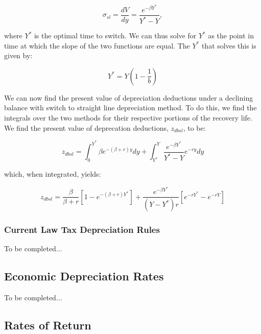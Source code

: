 \documentclass[article,11pt,letterpaper,fleqn]{article}
\theoremstyle{definition}
\numberwithin{equation}{section}
\begin{document}
\begin{equation}
\sigma_{sl} =  \frac{dV}{dy}=\frac{e^{-\beta Y^{*}}}{Y^{*}-Y},
\end{equation}

\noindent\noindent where $Y^{*}$ is the optimal time to switch. We can thus solve for $Y^{*}$ as the point in time at which the slope of the two functions are equal.  The $Y^{*}$ that solves this is given by:

\begin{equation}
Y^{*}=Y\left(1-\frac{1}{b}\right)
\end{equation}

We can now find the present value of depreciation deductions under a declining balance with switch to straight line depreciation method.  To do this, we find the integrals over the two methods for their respective portions of the recovery life.  We find the present value of deprecation deductions, $z_{dbsl}$, to be:

\begin{equation}
z_{dbsl}=\int_{0}^{Y^{*}}\beta e^{-(\beta+r)y}dy+\int_{Y^{*}}^{Y}\frac{e^{-\beta Y^{*}}}{Y^{*}-Y}e^{-ry}dy
\end{equation}

\noindent\noindent which, when integrated, yields:

\begin{equation}
z_{dbsl}=\frac{\beta}{\beta+r}\left[1-e^{-(\beta+r)Y^{*}}\right]+\frac{e^{-\beta Y^{*}}}{(Y-Y^{*})r}\left[e^{-rY^{*}}-e^{-rY}\right]
\end{equation}

\subsubsection{Current Law Tax Depreciation Rules}

To be completed...


\subsection{Economic Depreciation Rates}

To be completed...

\subsection{Rates of Return}
\end{document}
